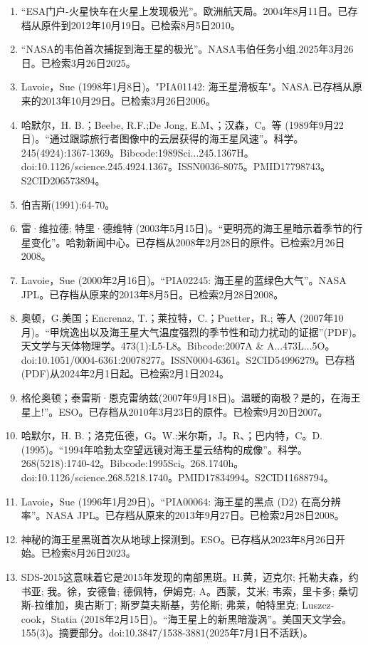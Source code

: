 \begin{enumerate}
\item “ESA门户-火星快车在火星上发现极光”。欧洲航天局。2004年8月11日。已存档从原件到2012年10月19日。已检索8月5日2010。
\item “NASA的韦伯首次捕捉到海王星的极光”。NASA韦伯任务小组.2025年3月26日。已检索3月26日2025。
\item Lavoie，Sue (1998年1月8日)。"PIA01142: 海王星滑板车"。NASA.已存档从原来的2013年10月29日。已检索3月26日2006。
\item 哈默尔，H. B.；Beebe, R.F.;De Jong, E.M、；汉森，C。等 (1989年9月22日)。“通过跟踪旅行者图像中的云层获得的海王星风速”。科学。245(4924):1367-1369。Bibcode:1989Sci...245.1367H。doi:10.1126/science.245.4924.1367。ISSN0036-8075。PMID17798743。S2CID206573894。   
\item 伯吉斯(1991):64-70。
\item 雷·维拉德; 特里·德维特 (2003年5月15日)。“更明亮的海王星暗示着季节的行星变化”。哈勃新闻中心。已存档从2008年2月28日的原件。已检索2月26日2008。
\item Lavoie，Sue (2000年2月16日)。“PIA02245: 海王星的蓝绿色大气”。NASA JPL。已存档从原来的2013年8月5日。已检索2月28日2008。
\item 奥顿，G.美国；Encrenaz, T.；莱拉特，C.；Puetter，R.; 等人 (2007年10月)。“甲烷逸出以及海王星大气温度强烈的季节性和动力扰动的证据”(PDF)。天文学与天体物理学。473(1):L5-L8。Bibcode:2007A & A...473L...5O。doi:10.1051/0004-6361:20078277。ISSN0004-6361。S2CID54996279。已存档(PDF)从2024年2月1日起。已检索2月1日2024。   
\item 格伦奥顿；泰雷斯·恩克雷纳兹(2007年9月18日)。温暖的南极？是的，在海王星上!”。ESO。已存档从2010年3月23日的原件。已检索9月20日2007。
\item 哈默尔，H. B.；洛克伍德，G。W.;米尔斯，J。R、；巴内特，C。D.(1995)。“1994年哈勃太空望远镜对海王星云结构的成像”。科学。268(5218):1740-42。Bibcode:1995Sci。268.1740h。doi:10.1126/science.268.5218.1740。PMID17834994。S2CID11688794。  
\item Lavoie，Sue (1996年1月29日)。“PIA00064: 海王星的黑点 (D2) 在高分辨率”。NASA JPL。已存档从原来的2013年9月27日。已检索2月28日2008。
\item 神秘的海王星黑斑首次从地球上探测到。ESO。已存档从2023年8月26日开始。已检索8月26日2023。
\item SDS-2015这意味着它是2015年发现的南部黑斑。H.黄，迈克尔; 托勒夫森，约书亚; 我。徐，安德鲁; 德佩特，伊姆克; A。西蒙，艾米; 韦索，里卡多; 桑切斯-拉维加，奥古斯丁; 斯罗莫夫斯基，劳伦斯; 弗莱，帕特里克; Luszcz-cook，Statia (2018年2月15日)。“海王星上的新黑暗漩涡”。美国天文学会。155(3)。摘要部分。doi:10.3847/1538-3881(2025年7月1日不活跃)。

\end{enumerate}

